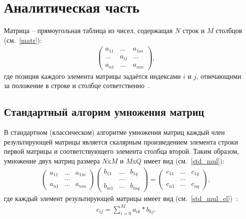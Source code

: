 \chapter{Аналитическая часть}


Матрица -- прямоугольная таблица из чисел, содержащая $N$ строк и $M$ столбцов (см.~\ref{matr}):
\begin{align}
	\label{matr}
	\begin{pmatrix}
		a_{11} & ... & a_{1m} \\
		... & a_{ij} & ... \\
		a_{n1} & ... & a_{nm}
	\end{pmatrix},
\end{align}
где позиция каждого элемента матрицы задаётся индексами $i$ и $j$, отвечающими за положение в строке и столбце сответственно~\cite{lit1}. 

\section{Стандартный алгорим умножения матриц}

В стандартном (классическом) алгоритме умножения матриц каждый член результирующей матрицы является скалярным произведением элемента строки первой матрицы и соответствующего элемента столбца второй. Таким образом, умножение двух матриц размера $N$x$M$ и $M$x$Q$ имеет вид (см.~\ref{std_mul}):
\begin{align}
	\label{std_mul}
	\begin{pmatrix}
		a_{11} & ... & a_{1m} \\
		 & ... &  \\
		a_{n1} & ... & a_{nm}
	\end{pmatrix}
	\begin{pmatrix}
		b_{11} & ... & b_{1q} \\
		& ... &  \\
		b_{m1} & ... & b_{mq}
	\end{pmatrix}
	=
	\begin{pmatrix}
		c_{11} & ... & c_{1q} \\
		 & ... &  \\
		c_{n1} & ... & c_{nq}
	\end{pmatrix},
\end{align}
где каждый элемент результирующей матрицы имеет вид (см.~\ref{std_mul_el})~\cite{lit2}:
\begin{align}
	\label{std_mul_el}
	c_{ij} = \sum_{i=0}^{M} a_{ik}*b_{kj}.
\end{align}

